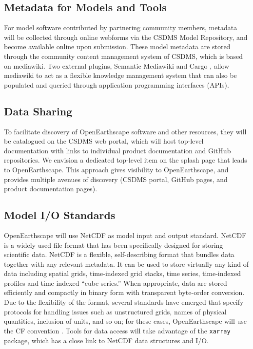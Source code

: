 \subsection*{Metadata for Models and Tools}

For model software contributed by partnering community members, metadata will be collected through online webforms via the CSDMS Model Repository, and become available online upon submission. These model metadata are stored through the community content management system of CSDMS, which is based on mediawiki. Two external plugins, Semantic Mediawiki \citep{krotzsch2006semantic}
and Cargo \citep{koren2018cargo}, 
allow mediawiki to act as a flexible knowledge management system that can also be populated and queried through application programming interfaces (APIs).

\subsection*{Data Sharing}

To facilitate discovery of OpenEarthscape software and other resources, they will be catalogued on the CSDMS web portal, which will host top-level documentation with links to individual product documentation and GitHub repositories. We envision a dedicated top-level item on the splash page that leads to OpenEarthscape. This approach gives visibility to OpenEarthscape, and provides multiple avenues of discovery (CSDMS portal, GitHub pages, and product documentation pages).


\subsection*{Model I/O Standards}

OpenEarthscape will use NetCDF as model input and output standard. NetCDF is a widely used file format that has been specifically designed for storing scientific data. NetCDF is a flexible, self-describing format that bundles data together with any relevant metadata. It can be used to store virtually any kind of data including spatial grids, time-indexed grid stacks, time series, time-indexed profiles and time indexed ``cube series.'' When appropriate, data are stored efficiently and compactly in binary form with transparent byte-order conversion. Due to the flexibility of the format, several standards have emerged that specify protocols for handling issues such as unstructured grids, names of physical quantities, inclusion of units, and so on; for these cases, OpenEarthscape will use the CF convention \citep{cf2017conventions}. Tools for data access will take advantage of the \texttt{xarray} package, which has a close link to NetCDF data structures and I/O.

